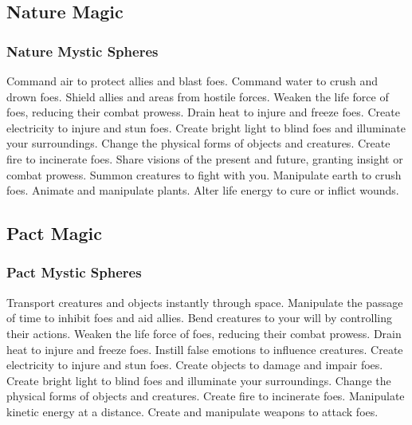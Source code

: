 \small
\subsection{Nature Magic}\label{Nature Magic}
\subsubsection{Nature Mystic Spheres}\label{Nature Mystic Spheres}
\begin{spelllist}
 Command air to protect allies and blast foes.
 Command water to crush and drown foes.
 Shield allies and areas from hostile forces.
 Weaken the life force of foes, reducing their combat prowess.
 Drain heat to injure and freeze foes.
 Create electricity to injure and stun foes.
 Create bright light to blind foes and illuminate your surroundings.
 Change the physical forms of objects and creatures.
 Create fire to incinerate foes.
 Share visions of the present and future, granting insight or combat prowess.
 Summon creatures to fight with you.
 Manipulate earth to crush foes.
 Animate and manipulate plants.
 Alter life energy to cure or inflict wounds.
\end{spelllist}



\small
\subsection{Pact Magic}\label{Pact Magic}
\subsubsection{Pact Mystic Spheres}\label{Pact Mystic Spheres}
\begin{spelllist}
 Transport creatures and objects instantly through space.
 Manipulate the passage of time to inhibit foes and aid allies.
 Bend creatures to your will by controlling their actions.
 Weaken the life force of foes, reducing their combat prowess.
 Drain heat to injure and freeze foes.
 Instill false emotions to influence creatures.
 Create electricity to injure and stun foes.
 Create objects to damage and impair foes.
 Create bright light to blind foes and illuminate your surroundings.
 Change the physical forms of objects and creatures.
 Create fire to incinerate foes.
 Manipulate kinetic energy at a distance.
 Create and manipulate weapons to attack foes.
\end{spelllist}
